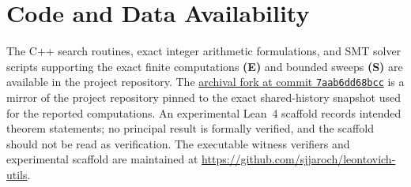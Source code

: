 \section*{Code and Data Availability}
The C++ search routines, exact integer arithmetic formulations, and SMT
solver scripts supporting the exact finite computations \textbf{(E)}
and bounded sweeps \textbf{(S)} are available in the project
repository. The
\href{https://github.com/sjjaroch/leontovich-utils/tree/7aab6dd68bccd7614794c75333dddc692b53541f}{archival fork at commit \texttt{7aab6dd68bcc}}
is a mirror of the project repository pinned to the exact shared-history
snapshot used for the reported computations. An experimental Lean~4 scaffold
records intended theorem statements; no principal result is formally
verified, and the scaffold should not be read as verification. The executable
witness verifiers and experimental scaffold are maintained at
\url{https://github.com/sjjaroch/leontovich-utils}.
